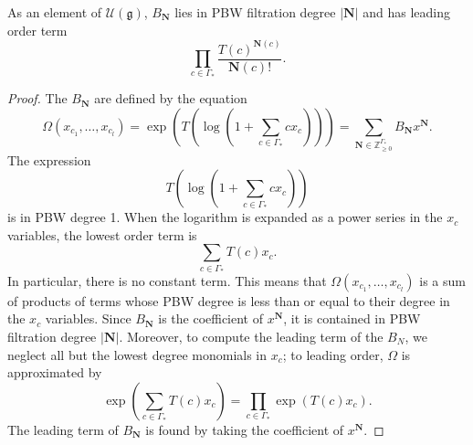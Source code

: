 \documentclass[ALCO,Unicode]{cedram}
\begin{document}
\begin{lemma} \label{leading_term_lemma}
As an element of $\mathcal{U}(\mathfrak{g})$, $B_{\mathbf{N}}$ lies in PBW filtration degree $|\mathbf{N}|$ and has leading order term
\[
\prod_{c \in \Gamma_*} \frac{T(c)^{\mathbf{N}(c)}}{\mathbf{N}(c)!}.
\]
\end{lemma}
\begin{proof}
The $B_{\mathbf{N}}$ are defined by the equation
\[
\Omega(x_{c_1}, \ldots, x_{c_l}) = \exp\left(T\left(\log\left(1 + \sum_{c \in \Gamma_*} c x_c\right)\right)\right) = \sum_{\mathbf{N} \in \mathbb{Z}_{\geq 0}^{\Gamma_*}} B_{\mathbf{N}} x^{\mathbf{N}}.
\]
The expression
\[
T\left(\log\left(1 + \sum_{c \in \Gamma_*} c x_c\right)\right)
\]
is in PBW degree 1. When the logarithm is expanded as a power series in the $x_c$ variables, the lowest order term is
\[
\sum_{c \in \Gamma_*} T(c) x_c.
\]
In particular, there is no constant term. This means that $\Omega(x_{c_1}, \ldots, x_{c_l})$ is a sum of products of terms whose PBW degree is less than or equal to their degree in the $x_c$ variables. Since $B_{\mathbf{N}}$ is the coefficient of $x^{\mathbf{N}}$, it is contained in PBW filtration degree $|\mathbf{N}|$. Moreover, to compute the leading term of the $B_N$, we neglect all but the lowest degree monomials in $x_c$; to leading order, $\Omega$ is approximated by
\[
\exp\left( \sum_{c \in \Gamma_*} T(c) x_c\right) = 
\prod_{c \in \Gamma_*} \exp\left( T(c) x_c\right).
\]
The leading term of $B_{\mathbf{N}}$ is found by taking the coefficient of $x^{\mathbf{N}}$.
\end{proof}
\end{document}
